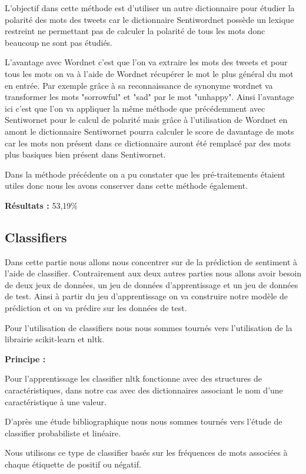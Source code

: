 \par L'objectif dans cette méthode est d'utiliser un autre dictionnaire pour étudier la polarité des mots des tweets car le dictionnaire Sentiwordnet possède un lexique restreint ne permettant pas de calculer la polarité de tous les mots donc beaucoup ne sont pas étudiés. \\

\par L'avantage avec Wordnet c'est que l'on va extraire les mots des tweets et pour tous les mots on va à l'aide de Wordnet récupérer le mot le plus général du mot en entrée. Par exemple grâce à sa reconnaissance de synonyme wordnet va transformer les mots "sorrowful" et "sad" par le mot "unhappy". Ainsi l'avantage ici c'est que l'on va appliquer la même méthode que précédemment avec Sentiwornet pour le calcul de polarité mais grâce à l'utilisation de Wordnet en amont le dictionnaire Sentiwornet pourra calculer le score de davantage de mots car les mots non présent dans ce dictionnaire auront été remplacé par des mots plus basiques bien présent dans Sentiwornet. \\

\par Dans la méthode précédente on a pu constater que les pré-traitements étaient utiles donc nous les avons conserver dans cette méthode également. \\

\par\textbf{ Résultats : } 53,19\%

\subsection{Classifiers}

\par Dans cette partie nous allons nous concentrer sur de la prédiction de sentiment à l'aide de classifier. Contrairement aux deux autres parties nous allons avoir besoin de deux jeux de données, un jeu de données d'apprentissage et un jeu de données de test. Ainsi à partir du jeu d'apprentissage on va construire notre modèle de prédiction et on va prédire sur les données de test. \\

\par Pour l'utilisation de classifiers nous nous sommes tournés vers l'utilisation de la librairie scikit-learn et nltk. \\

\par \textbf{Principe : } \\
\par Pour l'apprentissage les classifier nltk fonctionne avec des structures de caractéristiques, dans notre cas avec des dictionnaires associant le nom d'une caractéristique à une valeur.
\par D'après une étude bibliographique nous nous sommes tournés vers l'étude de classifier probabiliste et linéaire.
\par Nous utilisons ce type de classifier basés sur les fréquences de mots associées à chaque étiquette de positif ou négatif. \\


